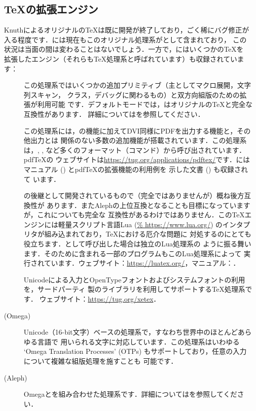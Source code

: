 \documentclass[uplatex,dvipdfmx,tombow]{jsarticle}
\begin{document}
\subsection{\TeX の拡張エンジン}
\label{sec:tex-extensions}

Knuthによるオリジナルの\TeX は既に開発が終了しており，ごく稀にバグ修正が
入る程度です．\TL には現在もこのオリジナル処理系がとして含まれており，
この状況は当面の間は変わることはないでしょう．一方で，\TL にはいくつかの\TeX を
拡張したエンジン（それらも\TeX 処理系と呼ばれています）も収録されています：
%
\begin{description}
\item[\eTeX]\label{text:etex}
この処理系ではいくつかの追加プリミティブ（主としてマクロ展開，文字列スキャン，
クラス，デバッグに関わるもの）と双方向組版のための\TeXXeT 拡張が利用可能
です．デフォルトモードでは，\eTeX はオリジナルの\TeX と完全な互換性があります．
詳細についてはを参照してください．

\item[\pdfTeX]
この処理系には，\eTeX の機能に加えてDVI同様にPDFを出力する機能と，その他出力とは
関係のない多数の追加機能が搭載されています．この処理系は，, ,
など多くのフォーマット（コマンド）から呼び出されています．pdf\TeX の
ウェブサイトは\url{https://tug.org/applications/pdftex/}です．\TL にはマニュアル
() とpdf\TeX の拡張機能の利用例を
示した文書 () も収録されて
います．

\item[\LuaTeX]
\pdfTeX の後継として開発されているもので（完全ではありませんが）概ね後方互換性が
あります．またAlephの上位互換となることも目標になっていますが，これについても完全な
互換性があるわけではありません．この\TeX エンジンには軽量スクリプト言語Lua (\url{%
https://www.lua.org/}) のインタプリタが組み込まれており，\TeX における厄介な問題に
対処するのにとても役立ちます．として呼び出した場合は独立のLua処理系の
ように振る舞います．そのため\TL に含まれる一部のプログラムもこのLua処理系によって
実行されています．ウェブサイト：\url{https://luatex.org/}，マニュアル：．

\item[\XeTeX]
Unicodeによる入力とOpenTypeフォントおよびシステムフォントの利用を，サードパーティ
製のライブラリを利用してサポートする\TeX 処理系です．
ウェブサイト：\url{https://tug.org/xetex}．

\item[{\OMEGA} (Omega)]
Unicode（16-bit文字）ベースの処理系で，すなわち世界中のほとんどあらゆる言語で
用いられる文字に対応しています．この処理系はいわゆる `Omega Translation
Processes' (OTPs) もサポートしており，任意の入力について複雑な組版処理を施すことも
可能です．

\item[{\ALEPH} (Aleph)]
Omegaと\eTeX を組み合わせた処理系です．詳細についてはを参照してください．
\end{description}
\end{document}
